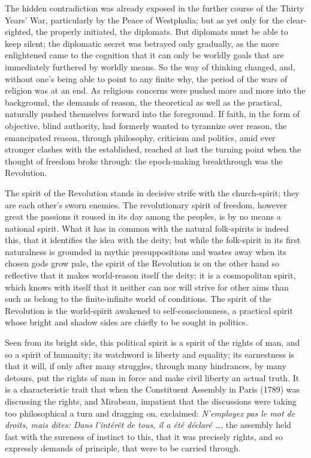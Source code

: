 \documentclass[12pt]{book}
\newcommand{\opage}[1]{\marginnote{\footnotesize\textit{[#1]}}}
\begin{document}
The hidden contradiction was already exposed in the further course of
the Thirty Years' War, particularly by the Peace of Westphalia; but as
yet only for the clear-sighted, the properly initiated, the diplomats.
But diplomats must be able to keep silent; the diplomatic secret was
betrayed only gradually, as the more enlightened came to the
cognition that it can only be worldly goals that are immediately
furthered by worldly means. So the way of thinking changed, and, without
one's being able to point to any finite why, the period of the wars of
religion was at an end. As religious concerns were pushed more and more
into the background, the demands of reason, the theoretical as well as
the practical, naturally pushed themselves forward into the foreground.
If faith, in the form of objective, blind authority, had formerly
wanted to tyrannize over reason, the emancipated reason, through
philosophy,
\opage{34}\setcounter{footnote}{0}%
criticism and politics, amid ever stronger clashes with the
established, reached at last the turning point when the thought of
freedom broke through: the epoch-making breakthrough was the Revolution.

The spirit of the Revolution stands in decisive strife with the
church-spirit; they are each other's sworn enemies. The revolutionary
spirit of freedom, however great the passions it roused in its day
among the peoples, is by no means a national spirit. What it has in
common with the natural folk-spirits is indeed this, that it identifies
the idea with the deity; but while the folk-spirit in its first
naturalness is grounded in mythic presuppositions and wastes away when
its chosen gods grow pale, the spirit of the Revolution is on the other
hand so reflective that it makes world-reason itself the deity; it is a
cosmopolitan spirit, which knows with itself that it neither can nor
will strive for other aims than such as belong to the finite-infinite
world of conditions. The spirit of the Revolution is the world-spirit
awakened to self-consciousness, a practical spirit whose bright and
shadow sides are chiefly to be sought in politics.

Seen from its bright side, this political spirit is a spirit of the
rights of man, and so a spirit of humanity; its watchword is liberty and
equality; its earnestness is that it will, if only after many struggles,
through many hindrances, by many detours, put the rights of man in force
and make civil liberty an actual truth. It is a characteristic trait
that when the Constituent Assembly in Paris (1789) was discussing the
rights, and Mirabeau, impatient that the discussions were taking too
philosophical a turn and dragging on, exclaimed: \textit{N'employez pas
le mot de droits, mais dites: Dans l'intérêt de tous, il a été déclaré
\dots}, the assembly held fast with the sureness of instinct
\opage{35}\setcounter{footnote}{0}%
to this, that it was precisely rights, and so expressly demands of
principle, that were to be carried through.
\end{document}
